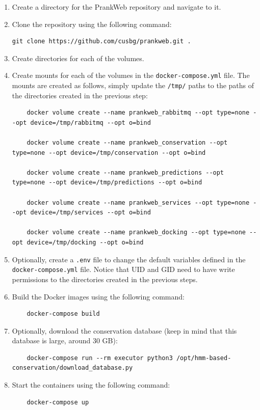\begin{enumerate}
    \item Create a directory for the PrankWeb repository and navigate to it.
    \item Clone the repository using the following command:
    \begin{lstlisting}[language=clean]
    git clone https://github.com/cusbg/prankweb.git .
    \end{lstlisting}
    \item Create directories for each of the volumes.
    \item Create mounts for each of the volumes in the \texttt{docker-compose.yml} file. The mounts are created as follows, simply update the \texttt{/tmp/} paths to the paths of the directories created in the previous step:
    \begin{lstlisting}
    docker volume create --name prankweb_rabbitmq --opt type=none --opt device=/tmp/rabbitmq --opt o=bind

    docker volume create --name prankweb_conservation --opt type=none --opt device=/tmp/conservation --opt o=bind

    docker volume create --name prankweb_predictions --opt type=none --opt device=/tmp/predictions --opt o=bind

    docker volume create --name prankweb_services --opt type=none --opt device=/tmp/services --opt o=bind

    docker volume create --name prankweb_docking --opt type=none --opt device=/tmp/docking --opt o=bind
    \end{lstlisting}
    \item Optionally, create a \texttt{.env} file to change the default variables defined in the \texttt{docker-compose.yml} file. Notice that UID and GID need to have write permissions to the directories created in the previous steps.
    \item Build the Docker images using the following command:
    \begin{lstlisting}
    docker-compose build
    \end{lstlisting}
    \item Optionally, download the conservation database (keep in mind that this database is large, around 30 GB):
    \begin{lstlisting}
    docker-compose run --rm executor python3 /opt/hmm-based-conservation/download_database.py
    \end{lstlisting}
    \item Start the containers using the following command:
    \begin{lstlisting}
    docker-compose up
    \end{lstlisting}
\end{enumerate}

